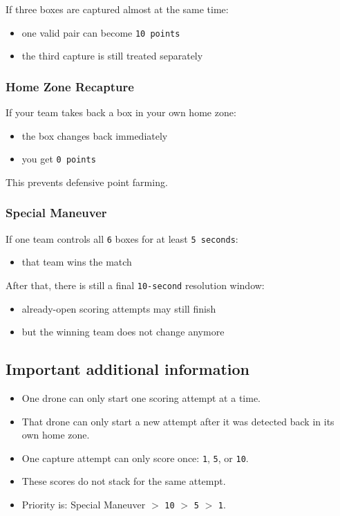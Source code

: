 If three boxes are captured almost at the same time:
\begin{itemize}
    \item one valid pair can become \texttt{10 points}
    \item the third capture is still treated separately
\end{itemize}

\subsubsection{Home Zone Recapture}

If your team takes back a box in your own home zone:
\begin{itemize}
    \item the box changes back immediately
    \item you get \texttt{0 points}
\end{itemize}

This prevents defensive point farming.

\subsubsection{Special Maneuver}

If one team controls all \texttt{6} boxes for at least \texttt{5 seconds}:
\begin{itemize}
    \item that team wins the match
\end{itemize}

After that, there is still a final \texttt{10-second} resolution window:
\begin{itemize}
    \item already-open scoring attempts may still finish
    \item but the winning team does not change anymore
\end{itemize}

\subsection{Important additional information}

\begin{itemize}
    \item One drone can only start one scoring attempt at a time.
    \item That drone can only start a new attempt after it was detected back in its own home zone.
    \item One capture attempt can only score once: \texttt{1}, \texttt{5}, or \texttt{10}.
    \item These scores do not stack for the same attempt.
    \item Priority is: Special Maneuver $>$ \texttt{10} $>$ \texttt{5} $>$ \texttt{1}.
\end{itemize}
